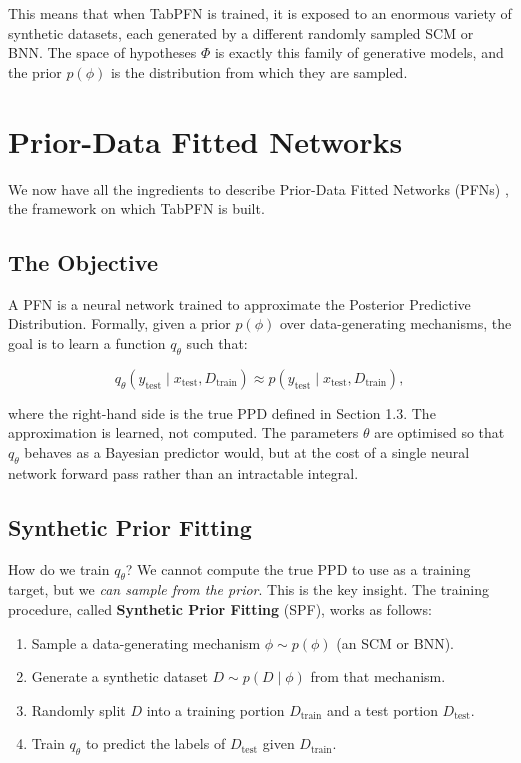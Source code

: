 \documentclass[12pt]{article}
\begin{document}
This means that when TabPFN is trained, it is exposed to an enormous variety of synthetic datasets, each generated by a different randomly sampled SCM or BNN. The space of hypotheses $\Phi$ is exactly this family of generative models, and the prior $p(\phi)$ is the distribution from which they are sampled.

\section{Prior-Data Fitted Networks}

We now have all the ingredients to describe Prior-Data Fitted Networks (PFNs) \cite{muller2022transformers}, the framework on which TabPFN is built.

\subsection{The Objective}

A PFN is a neural network trained to approximate the Posterior Predictive Distribution. Formally, given a prior $p(\phi)$ over data-generating mechanisms, the goal is to learn a function $q_\theta$ such that:

\[
q_\theta(y_{\text{test}} \mid x_{\text{test}}, D_{\text{train}}) \approx p(y_{\text{test}} \mid x_{\text{test}}, D_{\text{train}}),
\]

where the right-hand side is the true PPD defined in Section 1.3. The approximation is learned, not computed. The parameters $\theta$ are optimised so that $q_\theta$ behaves as a Bayesian predictor would, but at the cost of a single neural network forward pass rather than an intractable integral.

\subsection{Synthetic Prior Fitting}

How do we train $q_\theta$? We cannot compute the true PPD to use as a training target, but we \emph{can sample from the prior}. This is the key insight. The training procedure, called \textbf{Synthetic Prior Fitting} (SPF), works as follows:

\begin{enumerate}
    \item Sample a data-generating mechanism $\phi \sim p(\phi)$ (an SCM or BNN).
    \item Generate a synthetic dataset $D \sim p(D \mid \phi)$ from that mechanism.
    \item Randomly split $D$ into a training portion $D_{\text{train}}$ and a test portion $D_{\text{test}}$.
    \item Train $q_\theta$ to predict the labels of $D_{\text{test}}$ given $D_{\text{train}}$.
\end{enumerate}
\end{document}
